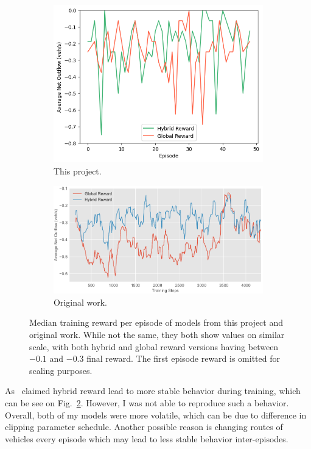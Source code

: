 \documentclass{article}
\begin{document}
    \begin{figure}[h]
        \centering
        \begin{subfigure}[b]{0.4\linewidth}
            \includegraphics[width=\linewidth]{figs/global_vs_hybrid.png}
            \caption{This project.}
            \label{fig-sub:global-hybrid-my}
        \end{subfigure}
        \begin{subfigure}[b]{0.45\linewidth}
            \includegraphics[width=\linewidth]{figs/global_vs_hybrid_reference.png}
            \caption{Original work.}
            \label{fig-sub:global-hybrid-orig}
        \end{subfigure}
        \caption{
            Median training reward per episode of models from this project and original work.
            While not the same, they both show values on similar scale,
            with both hybrid and global reward versions having between $-0.1$ and $-0.3$ final reward.
            The first episode reward is omitted for scaling purposes.
        }
        \label{fig:global-hybrid-rewards}
    \end{figure}
    As~\cite{sumo} claimed hybrid reward lead to more stable behavior during training, which can be see on Fig.~\ref{fig-sub:global-hybrid-orig}.
    However, I was not able to reproduce such a behavior.
    Overall, both of my models were more volatile, which can be due to difference in clipping parameter schedule.
    Another possible reason is changing routes of vehicles every episode which may lead to less stable behavior inter-episodes.
\end{document}
